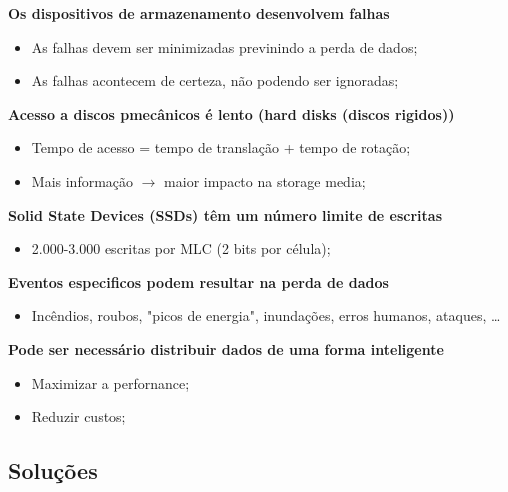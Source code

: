 \documentclass{article}
\begin{document}
\begin{flushleft}
  \textbf{Os dispositivos de armazenamento desenvolvem falhas}
  \begin{itemize}
    \item As falhas devem ser minimizadas previnindo a perda de dados;
    \item As falhas acontecem de certeza, não podendo ser ignoradas;
  \end{itemize}

  \textbf{Acesso a discos pmecânicos é lento (hard disks (discos rigidos))}
  \begin{itemize}
    \item Tempo de acesso = tempo de translação + tempo de rotação;
    \item Mais informação $\rightarrow$ maior impacto na storage media;
  \end{itemize}

  \textbf{Solid State Devices (SSDs) têm um número limite de escritas}
  \begin{itemize}
    \item 2.000-3.000 escritas por MLC (2 bits por célula);
  \end{itemize}

  \textbf{Eventos especificos podem resultar na perda de dados}
  \begin{itemize}
    \item Incêndios, roubos, "picos de energia", inundações, erros
    humanos, ataques, \dots
  \end{itemize}

  \textbf{Pode ser necessário distribuir dados de uma forma inteligente}
  \begin{itemize}
    \item Maximizar a perfornance;
    \item Reduzir custos;
  \end{itemize}
\end{flushleft}

\subsection{Soluções}
\end{document}
